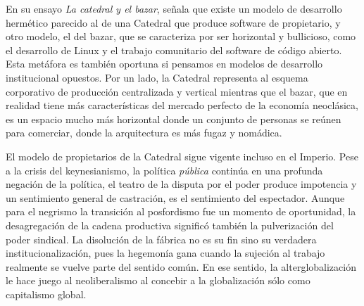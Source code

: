 En su ensayo \emph{La catedral y el bazar}, \autocite{raymondCathedralBazaarMusings2001} señala que existe un modelo de desarrollo hermético parecido al de una Catedral que produce software de propietario, y otro modelo, el del bazar, que se caracteriza por ser horizontal y bullicioso, como el desarrollo de Linux y el trabajo comunitario del software de código abierto. Esta metáfora es también oportuna si pensamos en modelos de desarrollo institucional opuestos. Por un lado, la Catedral representa al esquema corporativo de producción centralizada y vertical mientras que el bazar, que en realidad tiene más características del mercado perfecto de la economía neoclásica, es un espacio mucho más horizontal donde un conjunto de personas se reúnen para comerciar, donde la arquitectura es más fugaz y nomádica.

El modelo de propietarios de la Catedral sigue vigente incluso en el Imperio. Pese a la crisis del keynesianismo, la política \emph{pública} continúa en una profunda negación de la política, el teatro de la disputa por el poder produce impotencia y un sentimiento general de castración, es el sentimiento del espectador. Aunque para el negrismo la transición al posfordismo fue un momento de oportunidad, la desagregación de la cadena productiva significó también la pulverización del poder sindical. La disolución de la fábrica no es su fin sino su verdadera institucionalización, pues la hegemonía gana cuando la sujeción al trabajo realmente se vuelve parte del sentido común. En ese sentido, la alterglobalización le hace juego al neoliberalismo al concebir a la globalización sólo como capitalismo global.

